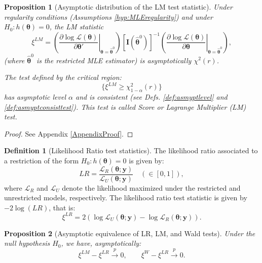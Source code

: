 \documentclass[
  11pt,
]{book}
\newtheorem{proposition}{Proposition}[chapter]
\theoremstyle{definition}
\newtheorem{definition}{Definition}[chapter]
\theoremstyle{definition}
\theoremstyle{definition}
\theoremstyle{definition}
\theoremstyle{remark}
\begin{document}
\begin{proposition}[Asymptotic distribution of the LM test statistic]
\protect\hypertarget{prp:LMdistri}{}\label{prp:LMdistri}Under regularity conditions (Assumptions \ref{hyp:MLEregularity}) and under \(H_0: h(\boldsymbol\theta)=0\), the LM statistic
\begin{equation}
\boxed{\xi^{LM} =
\left(\left.\frac{\partial \log \mathcal{L}(\boldsymbol\theta)}{\partial \boldsymbol\theta'}\right|_{\boldsymbol\theta = \hat{\boldsymbol\theta}^0}  \right)
[\mathbf{I}(\hat{\boldsymbol\theta}^0)]^{-1}
\left(\left.\frac{\partial \log \mathcal{L}(\boldsymbol\theta)}{\partial \boldsymbol\theta }\right|_{\boldsymbol\theta = \hat{\boldsymbol\theta}^0}  \right),} \label{eq:xiLM}
\end{equation}
(where \(\hat{\boldsymbol\theta}^0\) is the restricted MLE estimator) is asymptotically \(\chi^2(r)\).

The test defined by the critical region:
\[
\{\xi^{LM} \ge \chi^2_{1-\alpha}(r)\}
\]
has asymptotic level \(\alpha\) and is consistent (see Defs. \ref{def:asmyptlevel} and \ref{def:asmyptconsisttest}). This test is called \emph{Score} or \emph{Lagrange Multiplier (LM)} test.
\end{proposition}

\begin{proof}
See Appendix \ref{AppendixProof}.
\end{proof}

\begin{definition}[Likelihood Ratio test statistics]
\protect\hypertarget{def:LR}{}\label{def:LR}The likelihood ratio associated to a restriction of the form \(H_0: h({\boldsymbol\theta})=0\) is given by:
\[
LR = \frac{\mathcal{L}_R(\boldsymbol\theta;\mathbf{y})}{\mathcal{L}_U(\boldsymbol\theta;\mathbf{y})} \quad (\in [0,1]),
\]
where \(\mathcal{L}_R\) and \(\mathcal{L}_U\) denote the likelihood maximized under the restricted and unrestricted models, respectively. The likelihood ratio test statistic is given by \(-2\log(LR)\), that is:
\[
\boxed{\xi^{LR}= 2 (\log\mathcal{L}_U(\boldsymbol\theta;\mathbf{y})-\log\mathcal{L}_R(\boldsymbol\theta;\mathbf{y})).}
\]
\end{definition}

\begin{proposition}[Asymptotic equivalence of LR, LM, and Wald tests]
\protect\hypertarget{prp:equivLRLMW}{}\label{prp:equivLRLMW}Under the null hypothesis \(H_0\), we have, asymptotically:
\[
\xi^{LM}-\xi^{LR}\overset p\longrightarrow0,\qquad
\xi^{W}-\xi^{LR}\overset p\longrightarrow0.
\]
\end{proposition}
\end{document}
